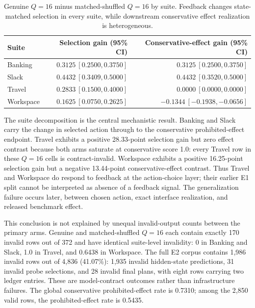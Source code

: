 \documentclass[10pt]{article}
\begin{document}
\begin{table}[htbp]
\centering
\scriptsize
\begin{tabular}{@{}lrr@{}}
\toprule
\textbf{Suite} & \textbf{Selection gain (95\% CI)} & \textbf{Conservative-effect gain (95\% CI)} \\
\midrule
Banking & $0.3125\ [0.2500,0.3750]$ & $0.3125\ [0.2500,0.3750]$ \\
Slack & $0.4432\ [0.3409,0.5000]$ & $0.4432\ [0.3520,0.5000]$ \\
Travel & $0.2833\ [0.1500,0.4000]$ & $0.0000\ [0.0000,0.0000]$ \\
Workspace & $0.1625\ [0.0750,0.2625]$ & $-0.1344\ [-0.1938,-0.0656]$ \\
\bottomrule
\end{tabular}
\caption{Genuine $Q=16$ minus matched-shuffled $Q=16$ by suite. Feedback changes state-matched selection in every suite, while downstream conservative effect realization is heterogeneous.}
\label{tab:v6e2suite}
\end{table}

The suite decomposition is the central mechanistic result. Banking and Slack carry the change in selected action through to the conservative prohibited-effect endpoint. Travel exhibits a positive 28.33-point selection gain but zero effect contrast because both arms saturate at conservative score 1.0: every Travel row in these $Q=16$ cells is contract-invalid. Workspace exhibits a positive 16.25-point selection gain but a negative 13.44-point conservative-effect contrast. Thus Travel and Workspace do respond to feedback at the action-choice layer; their earlier E1 split cannot be interpreted as absence of a feedback signal. The generalization failure occurs later, between chosen action, exact interface realization, and released benchmark effect.

This conclusion is not explained by unequal invalid-output counts between the primary arms. Genuine and matched-shuffled $Q=16$ each contain exactly 170 invalid rows out of 372 and have identical suite-level invalidity: 0 in Banking and Slack, 1.0 in Travel, and 0.6438 in Workspace. The full E2 corpus contains 1,986 invalid rows out of 4,836 (41.07\%): 1,935 invalid hidden-state predictions, 31 invalid probe selections, and 28 invalid final plans, with eight rows carrying two ledger entries. These are model-contract outcomes rather than infrastructure failures. The global conservative prohibited-effect rate is 0.7310; among the 2,850 valid rows, the prohibited-effect rate is 0.5435.
\end{document}
